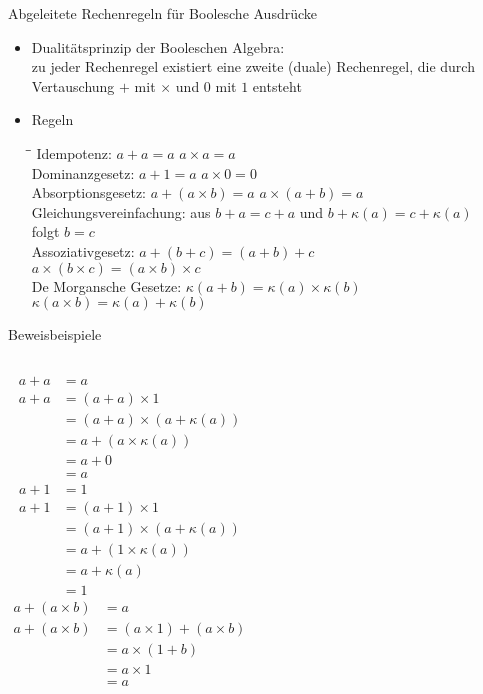 \begin{frame}{Abgeleitete Rechenregeln für Boolesche Ausdrücke}
	\begin{itemize}
		\item Dualitätsprinzip der Booleschen Algebra:\\
			zu jeder Rechenregel existiert eine zweite (duale) Rechenregel, die durch Vertauschung $+$ mit $\times$ und $0$ mit $1$ entsteht
		\item Regeln\\
		\begin{tabbing}
		\hspace{12em}\=\hspace{8em}\=\kill
		Idempotenz:	\> $a+a=a$  \> $a\times a = a$\\ 
		Dominanzgesetz:	\> $a+1=a$ \> $a\times 0 = 0$\\ 
		Absorptionsgesetz:	\> $a+(a\times b) = a$ \> $a \times (a + b) = a$\\ 
		Gleichungsvereinfachung:	\> aus $b+a=c+a$ und $b+\kappa(a)=c+\kappa(a)$ \\ 
									\> folgt $b=c$ \\ 
		Assoziativgesetz:	\> $a+(b+c)=(a+b)+c$ \\ 
							\> $a\times (b\times c)=(a\times b)\times c$ \\ 
		De Morgansche Gesetze:	\> $\kappa(a+b) = \kappa(a) \times \kappa(b)$ \\ 
								\> $\kappa(a\times b) = \kappa(a) + \kappa(b)$   
		\end{tabbing} 
	\end{itemize}
\end{frame}

\begin{frame}{Beweisbeispiele}
	\begin{columns}
		\begin{align*}
			a+a&=a\\
			a+a&=(a+a)\times 1\\
			   &=(a+a)\times (a+\kappa(a))\\
			   &=a+(a\times \kappa(a))\\
			   &=a+0\\
			   &=a
		\end{align*}
		\begin{align*}
			a+1&=1\\
			a+1&=(a+1)\times 1\\
			&=(a+1)\times (a+\kappa(a))\\
			&=a+(1\times \kappa(a))\\
			&=a+\kappa(a)\\
			&=1
		\end{align*}
		\begin{align*}
			a+(a\times b)&=a\\
			a+(a\times b)&=(a\times 1)+(a\times b)\\
			&=a\times (1+b)\\
			&=a\times 1\\
			&=a\\
		\end{align*}
	\end{columns}	
\end{frame}

